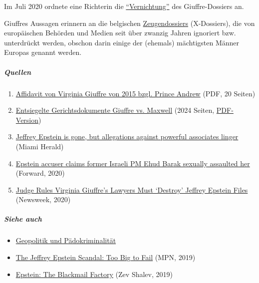 Im Juli 2020 ordnete eine Richterin die
\href{https://www.newsweek.com/judge-rules-virginia-giuffres-lawyers-must-destroy-jeffrey-epstein-files-1514909}{``Vernichtung''}
des Giuffre-Dossiers an.

Giuffres Aussagen erinnern an die belgischen
\href{https://isgp-studies.com/belgian-x-dossiers-of-the-dutroux-affair}{Zeugendossiers}
(X-Dossiers), die von europäischen Behörden und Medien seit über zwanzig
Jahren ignoriert bzw. unterdrückt werden, obschon darin einige der
(ehemals) mächtigsten Männer Europas genannt werden.

\hypertarget{quellen}{%
\subparagraph{\texorpdfstring{\textbf{Quellen}}{Quellen}}\label{quellen}}

\begin{enumerate}
\def\labelenumi{\arabic{enumi}.}
\tightlist
\item
  \href{https://assets.documentcloud.org/documents/1508973/roberts-affidavit.pdf}{Affidavit
  von Virginia Giuffre von 2015 bzgl. Prince Andrew} (PDF, 20 Seiten)
\item
  \href{https://www.businessinsider.com/epstein-giuffre-v-maxwell-unsealed-thousands-documents-defamation-2019-8}{Entsiegelte
  Gerichtsdokumente Giuffre vs. Maxwell} (2024 Seiten,
  \href{https://www.documentcloud.org/documents/6250471-Epstein-Docs.html}{PDF-Version})
\item
  \href{https://www.miamiherald.com/news/local/article233728717.html}{Jeffrey
  Epstein is gone, but allegations against powerful associates linger}
  (Miami Herald)
\item
  \href{https://forward.com/fast-forward/449432/virginia-giuffre-ehud-barak-jeffrey-epstein-alan-dershowitz/}{Epstein
  accuser claims former Israeli PM Ehud Barak sexually assaulted her}
  (Forward, 2020)
\item
  \href{https://www.newsweek.com/judge-rules-virginia-giuffres-lawyers-must-destroy-jeffrey-epstein-files-1514909}{Judge
  Rules Virginia Giuffre's Lawyers Must `Destroy' Jeffrey Epstein Files}
  (Newsweek, 2020)
\end{enumerate}

\hypertarget{siehe-auch}{%
\subparagraph{\texorpdfstring{\textbf{Siehe
auch}}{Siehe auch}}\label{siehe-auch}}

\begin{itemize}
\tightlist
\item
  \href{https://swprs.org/geopolitik-und-paedokriminalitaet/}{Geopolitik
  und Pädokriminalität}
\item
  \href{https://www.mintpressnews.com/category/epstein-investigation/}{The
  Jeffrey Epstein Scandal: Too Big to Fail} (MPN, 2019)
\item
  \href{https://narativ.org/2019/09/26/blackmailing-america/}{Epstein:
  The Blackmail Factory} (Zev Shalev, 2019)
\end{itemize}

